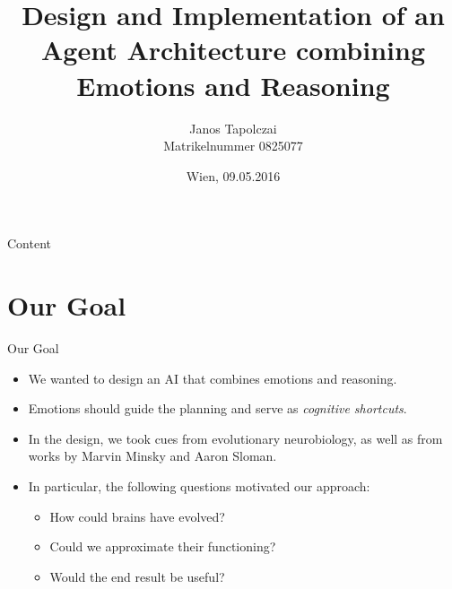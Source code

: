 \documentclass{beamer}
\title{Design and Implementation of an Agent Architecture combining Emotions and Reasoning}
\author{Janos Tapolczai\\ Matrikelnummer 0825077}
\date{Wien, 09.05.2016}
\begin{document}
   
   \begin{frame}
      \titlepage
   \end{frame}
   
   \begin{frame}{Content}
   \tableofcontents
   \end{frame}
   
   \section{Our Goal}

   \begin{frame}{Our Goal}
      \begin{itemize}
         \item We wanted to design an AI that combines emotions and reasoning.
         
         \medskip
         
         \item Emotions should guide the planning and serve as \emph{cognitive shortcuts}.
         
         \medskip
         
         \item In the design, we took cues from evolutionary neurobiology, as well as from works by Marvin Minsky and Aaron Sloman.
         
         \medskip
         
         \item In particular, the following questions motivated our approach:
         
         \begin{itemize}
            \item How could brains have evolved?
            \item Could we approximate their functioning?
            \item Would the end result be useful?
         \end{itemize}
      \end{itemize}
   \end{frame}
   
\end{document}
